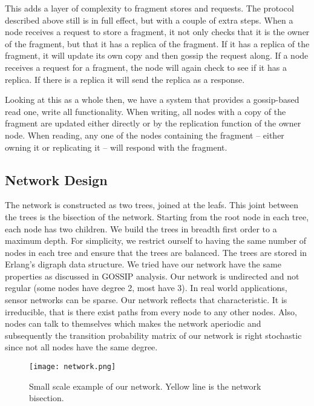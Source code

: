 This adds a layer of complexity to fragment stores and requests. The protocol described above still is in full effect, but with a couple of extra steps. When a node receives a request to store a fragment, it not only checks that it is the owner of the fragment, but that it has a replica of the fragment. If it has a replica of the fragment, it will update its own copy and then gossip the request along. If a node receives a request for a fragment, the node will again check to see if it has a replica. If there is a replica it will send the replica as a response.

Looking at this as a whole then, we have a system that provides a gossip-based read one, write all functionality. When writing, all nodes with a copy of the fragment are updated either directly or by the replication function of the owner node. When reading, any one of the nodes containing the fragment – either owning it or replicating it – will respond with the fragment.

\subsection{Network Design}
The network is constructed as two trees, joined at the leafs. This joint between the trees is the bisection of the network. Starting from the root node in each tree, each node has two children. We build the trees in breadth first order to a maximum depth. For simplicity, we restrict ourself to having the same number of nodes in each tree and ensure that the trees are balanced. The trees are stored in Erlang’s digraph data structure. We tried have our network have the same properties as discussed in GOSSIP analysis. Our network is undirected and not regular (some nodes have degree 2, most have 3). In real world applications, sensor networks can be sparse. Our network reflects that characteristic. It is irreducible, that is there exist paths
from every node to any other nodes. Also, nodes can talk to themselves which makes the network aperiodic and subsequently the transition probability matrix of our network is right stochastic since not all nodes have the same degree.

\begin{figure}[ht!]
\centering
\texttt{[image: network.png]}
\caption{Small scale example of our network. Yellow line is the network bisection.}
\label{overflow}
\end{figure}

